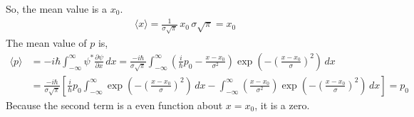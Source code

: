 \documentclass[floatfix,nofootinbib,superscriptaddress,fleqn]{revtex4}
\begin{document}
\begin{itemize}
So, the mean value is a $x_0$.
  \begin{align}
    \langle x \rangle=\frac{1}{\sigma\sqrt{\pi}}\,x_0\,\sigma\sqrt{\pi} = x_0
  \end{align}
The mean value of $p$ is,
  \begin{align}
    \langle p \rangle &= -i\hbar \int_{-\infty}^{\infty} 
    \psi^*\frac{\partial \psi}{\partial x}\,dx 
    =\frac{-i\hbar}{\sigma\sqrt{\pi}}
    \int_{-\infty}^{\infty}\left(\frac{i}{\hbar}p_0
    -\frac{x-x_0}{\sigma^2}\right)
    \exp\left(-{\left(\frac{x-x_0}{\sigma}\right)}^2 \right)\,dx \\
    &=\frac{-i\hbar}{\sigma\sqrt{\pi}}\left[\frac{i}{\hbar}p_0\int_{-\infty}^{\infty}
    \exp\left( -{\left(\frac{x-x_0}{\sigma}\right)}^2 \right)\,dx 
    -\int_{-\infty}^{\infty}\left(\frac{x-x_0}{\sigma^2}\right)
    \exp\left(-{\left(\frac{x-x_0}{\sigma}\right)}^2 \right)\,dx\right] 
    = p_0    
  \end{align}
Because the second term is a even function about $x=x_0$, it is a zero.


\end{itemize}
\end{document}
